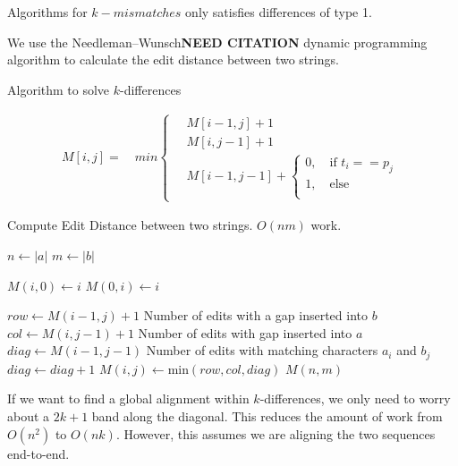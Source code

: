 Algorithms for $k-mismatches$ only satisfies differences of type 1.

We use the Needleman–Wunsch{\bf NEED CITATION} dynamic programming algorithm to calculate the edit distance between two strings.


 Algorithm to solve $k$-differences 

\begin{equation}
\begin{aligned}
M[i, j] = \quad min
\begin{cases}
\quad M[i - 1, j] + 1 \\
\quad M[i, j-1] + 1 \\
\quad M[i-1, j-1] + \begin{cases} 
0, \quad \text{if }t_i == p_j \\
1, \quad \text{else } \\
\end{cases}
\end{cases}
\end{aligned}
\end{equation}



 \begin{algorithm}
 \caption{Compute Edit Distance between two strings.  $O(nm)$ work.}\label{edit_distance}
 \begin{algorithmic}[1]
 \State $n\gets |a|$
 \State $m\gets |b|$

    \State $M(i,0) \gets i$ \EndFor
  \State $M(0,i) \gets i$
\EndFor

  \State $row \gets M(i-1,j) + 1$ \Comment Number of edits with a gap inserted into $b$
  \State $col \gets M(i,j-1) + 1$ \Comment Number of edits with gap inserted into $a$
  \State $diag \gets M(i-1, j-1)$ \Comment Number of edits with matching characters $a_i$ and $b_j$
    $diag \gets diag +  1$ \EndIf
  \State $M(i,j) \gets \text{min}(row,col,diag)$
\EndFor
\EndFor
\Return $M(n,m)$
\EndProcedure
\end{algorithmic}
\end{algorithm}

If we want to find a global alignment within $k$-differences, we only need to worry about a $2k+1$ band along the diagonal.
This reduces the amount of work from $O(n^2)$ to $O(nk)$.
However, this assumes we are aligning the two sequences end-to-end.

